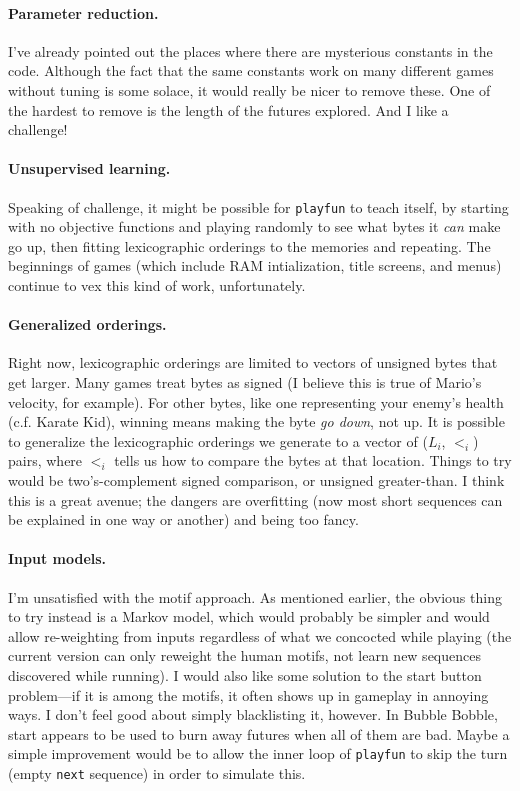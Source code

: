 \documentclass[twocolumn]{article}
\begin{document}
\paragraph{Parameter reduction.}
I've already pointed out the places where there are mysterious
constants in the code. Although the fact that the same constants work
on many different games without tuning is some solace, it would really
be nicer to remove these. One of the hardest to remove is the length
of the futures explored. And I like a challenge!

\paragraph{Unsupervised learning.}
Speaking of challenge, it might be possible for {\tt playfun} to teach
itself, by starting with no objective functions and playing randomly
to see what bytes it {\em can} make go up, then fitting lexicographic
orderings to the memories and repeating. The beginnings of games
(which include RAM intialization, title screens, and menus) continue
to vex this kind of work, unfortunately.

\paragraph{Generalized orderings.}
Right now, lexicographic orderings are limited to vectors of unsigned
bytes that get larger. Many games treat bytes as signed (I believe
this is true of Mario's velocity, for example). For other bytes, like
one representing your enemy's health (c.f. Karate Kid), winning means
making the byte {\em go down}, not up. It is possible to generalize
the lexicographic orderings we generate to a vector of ($L_i$, $<_i$)
pairs, where $<_i$ tells us how to compare the bytes at that location.
Things to try would be two's-complement signed comparison, or unsigned
greater-than. I think this is a great avenue; the dangers are
overfitting (now most short sequences can be explained in one way or
another) and being too fancy.

\paragraph{Input models.}
I'm unsatisfied with the motif approach. As mentioned earlier, the
obvious thing to try instead is a Markov model, which would probably
be simpler and would allow re-weighting from inputs regardless of what
we concocted while playing (the current version can only reweight the
human motifs, not learn new sequences discovered while running). I
would also like some solution to the start button problem---if it is
among the motifs, it often shows up in gameplay in annoying ways. I
don't feel good about simply blacklisting it, however. In Bubble
Bobble, start appears to be used to burn away futures when all of them
are bad. Maybe a simple improvement would be to allow the inner loop
of {\tt playfun} to skip the turn (empty {\tt next} sequence) in
order to simulate this.
\end{document}
